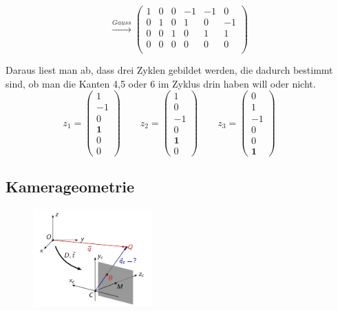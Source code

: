 \[\xrightarrow{Gauss} \begin{pmatrix}
	1 & 0 & 0 & -1 & -1 & 0 \\
	0 & 1 & 0 & 1 & 0 & -1 \\
	0 & 0 & 1 & 0 & 1 & 1 \\
	0 & 0 &0 &0 &0 &0 \\
\end{pmatrix}\]

\noindent Daraus liest man ab, dass drei Zyklen gebildet werden, die dadurch bestimmt sind, ob man die Kanten 4,5 oder 6 im Zyklus drin haben will oder nicht. 
 \[
 z_1 = \begin{pmatrix}
 	1 \\ -1 \\ 0 \\ \textbf{1} \\ 0 \\ 0
 \end{pmatrix} 
\qquad
z_2 = \begin{pmatrix}
	1 \\ 0 \\ -1 \\ 0 \\ \textbf{1} \\ 0
\end{pmatrix} 
\qquad
z_3 = \begin{pmatrix}
	0 \\ 1 \\ -1 \\ 0 \\ 0 \\ \textbf{1}
\end{pmatrix} 
\qquad
\]

\newpage

\subsection{Kamerageometrie}
\begin{figure}
	\vspace{-10pt}
	\centering
	\includegraphics[height=10em]{./Images/kamera_geometrie.png}
\end{figure}


